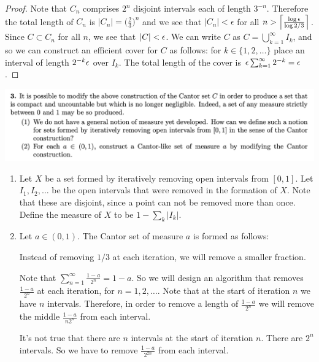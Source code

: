 \begin{enumerate}[label=(2.\arabic*)]
\begin{proof}
    Note that $C_n$ comprises $2^n$ disjoint intervals each of length $3^{-n}$. Therefore the total length
    of $C_n$ is $|C_n| = \big(\frac{2}{3}\big)^n$ and we see that $|C_n| < \epsilon$ for
    all $n > \Big\lceil\frac{\log\epsilon}{\log 2/3} \Big\rceil$. Since $C \subset C_n$ for all $n$, we see
    that $|C| < \epsilon$. We can write $C$ as $C = \bigcup_{k=1}^\infty I_k$, and so we can construct an efficient
    cover for $C$ as follows: for $k \in \{1, 2, \ldots\}$ place an interval of length $2^{-k}\epsilon$ over $I_k$.
    The total length of the cover is $\epsilon\sum_{k=1}^\infty 2^{-k} = \epsilon$.

  \end{proof}

\end{enumerate}

\newpage
\begin{mdframed}
  \includegraphics[width=400pt]{img/analysis--berkeley-202a-6b7a.png}
\end{mdframed}

\begin{enumerate}[label=(3.\arabic*)]

\item
  \begin{definition*}
    Let $X$ be a set formed by iteratively removing open intervals from $[0, 1]$. Let $I_1, I_2, \ldots$ be the
    open intervals that were removed in the formation of $X$. Note that these are disjoint, since a point can
    not be removed more than once. Define the measure of $X$ to be $1 - \sum_k |I_k|$.
  \end{definition*}

\item
  \begin{definition*}
    Let $a \in (0, 1)$. The Cantor set of measure $a$ is formed as follows:

    Instead of removing $1/3$ at each iteration, we will remove a smaller fraction.

    Note that $\sum_{n=1}^\infty \frac{1 - a}{2^n} = 1 - a$. So we will design an algorithm that
    removes $\frac{1-a}{2^n}$ at each iteration, for $n=1, 2, \ldots$. Note that at the start of iteration $n$
    we have $n$ intervals. Therefore, in order to remove a length of $\frac{1-a}{2^n}$ we will remove the
    middle $\frac{1-a}{n2^n}$ from each interval.

     It's not true that there are $n$ intervals at the start of iteration $n$. There are $2^n$ intervals. So
    we have to remove $\frac{1-a}{2^{2n}}$ from each interval.
  \end{definition*}
\end{enumerate}



